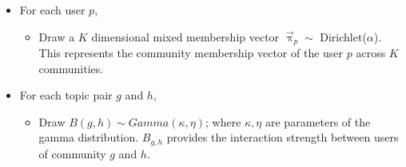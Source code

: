 \documentclass{sig-alternate}
\begin{document}
\begin{itemize}[noitemsep,nolistsep]
  \item For each user $p $,
  \begin{itemize}[noitemsep,nolistsep]
    \item Draw a $K$ dimensional mixed membership vector 
    $\overset{\rightarrow}{\uppi}_{p} \sim$ Dirichlet($\alpha$). 
	This represents the community membership vector of the user $p$
	across $K$ communities.
  \end{itemize}
  \item For each topic pair $g$ and $h$,
    \begin{itemize}[noitemsep,nolistsep]
    \item Draw $B(g,h) \sim Gamma(\kappa,\eta)$; where $\kappa, \eta$ are
	parameters of the gamma distribution. $B_{g,h}$ provides the interaction
	strength between users of community $g$ and $h$.
  \end{itemize}


\end{itemize}
\end{document}
